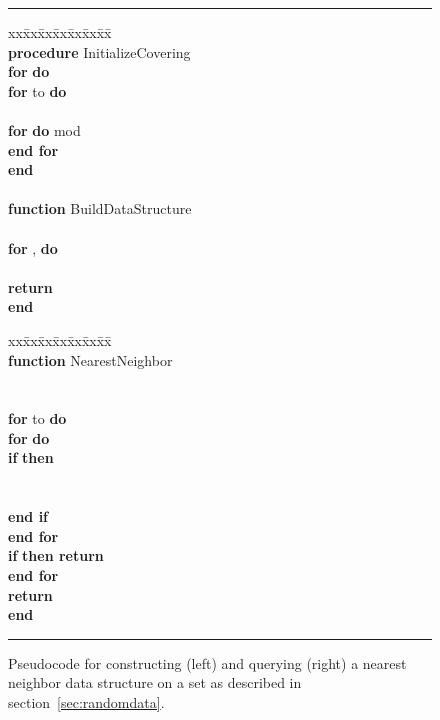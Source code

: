 \documentclass[prodmode,acmtalg]{acmsmall}
\begin{document}
\begin{figure}[t]
	\hrule
\begin{minipage}{.5\linewidth}
	\begin{tabbing}
	  xx\=xx\=xx\=xx\=xx\=xx\=xx\=\kill\\
	  {\bf procedure} {\sc InitializeCovering}\+\\
	    {\bf for}  {\bf do} \\
	    {\bf for}  to  {\bf do} \+\\
			\\
	    	{\bf for}  {\bf do}
				 mod \-\\
	  {\bf end for}\-\\
	  {\bf end}\\
	  \\
	  {\bf function} {\sc BuildDataStructure}\+\\
	  	\\
{\bf for} ,  {\bf do}\+\\
		      \-\\
		{\bf return} \-\\
	  {\bf end}\\
	\end{tabbing}
	\end{minipage}
	\begin{minipage}{.5\linewidth}
	\begin{tabbing}
	  xx\=xx\=xx\=xx\=xx\=xx\=xx\=\kill
	  \+\+\\
	  {\bf function} {\sc NearestNeighbor}\+\\
	  	\\ 
	  	\\ 
	    {\bf for}  to  {\bf do} \+\\
			{\bf for}  {\bf do}\+\\
		  		{\bf if}  {\bf then}\+\\
					\\
					\-\\
				{\bf end if}\-\\
			{\bf end for}\\
			{\bf if}  {\bf then return} \-\\
		{\bf end for}\\
		{\bf return} \-\\
	  {\bf end}
	\end{tabbing}
	\vspace{2.5mm}
	\end{minipage}
	\hrule
\caption{Pseudocode for constructing (left) and querying (right) a nearest neighbor data structure on a set  as described in section~\ref{sec:randomdata}.
}
\end{figure}
\end{document}
